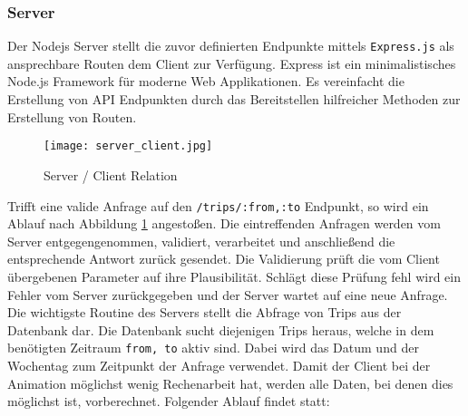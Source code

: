 \subsubsection{Server}
\label{ssub:server}
  Der Nodejs Server stellt die zuvor definierten Endpunkte mittels \texttt{Express.js} als ansprechbare Routen dem Client zur Verfügung. Express ist ein minimalistisches Node.js Framework für moderne Web Applikationen. Es vereinfacht die Erstellung von API Endpunkten durch das Bereitstellen hilfreicher Methoden zur Erstellung von Routen\footnotemark.


  \begin{figure}[htbp]
    \begin{center}
      \texttt{[image: server\_client.jpg]}
      \caption{Server / Client Relation}
      \label{fig:server_client}
    \end{center}
  \end{figure}

  Trifft eine valide Anfrage auf den \texttt{/trips/:from,:to} Endpunkt, so wird ein Ablauf nach Abbildung \ref{fig:server_client} angestoßen.
  Die eintreffenden Anfragen werden vom Server entgegengenommen, validiert, verarbeitet und anschließend die entsprechende Antwort zurück gesendet. Die Validierung prüft die vom Client übergebenen Parameter auf ihre Plausibilität. Schlägt diese Prüfung fehl wird ein Fehler vom Server zurückgegeben und der Server wartet auf eine neue Anfrage. Die wichtigste Routine des Servers stellt die Abfrage von Trips aus der Datenbank dar. Die Datenbank sucht diejenigen Trips heraus, welche in dem benötigten Zeitraum \texttt{from, to} aktiv sind. Dabei wird das Datum und der Wochentag zum Zeitpunkt der Anfrage verwendet. Damit der Client bei der Animation möglichst wenig Rechenarbeit hat, werden alle Daten, bei denen dies möglichst ist, vorberechnet. Folgender Ablauf findet statt:

